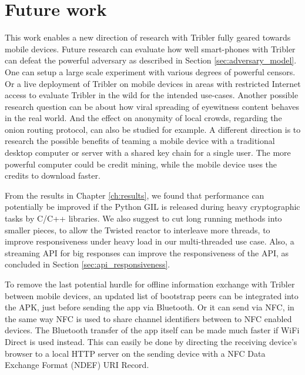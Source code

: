 \section{Future work}\label{sec:future_work}
This work enables a new direction of research with Tribler fully geared towards mobile devices.
Future research can evaluate how well smart-phones with Tribler can defeat the powerful adversary as described in Section \ref{sec:adversary_model}.
One can setup a large scale experiment with various degrees of powerful censors.
Or a live deployment of Tribler on mobile devices in areas with restricted Internet access to evaluate Tribler in the wild for the intended use-cases.
Another possible research question can be about how viral spreading of eyewitness content behaves in the real world.
And the effect on anonymity of local crowds, regarding the onion routing protocol, can also be studied for example.
A different direction is to research the possible benefits of teaming a mobile device with a traditional desktop computer or server with a shared key chain for a single user.
The more powerful computer could be credit mining, while the mobile device uses the credits to download faster.

From the results in Chapter \ref{ch:results}, we found that performance can potentially be improved if the Python GIL is released during heavy cryptographic tasks by C/C++ libraries.
We also suggest to cut long running methods into smaller pieces, to allow the Twisted reactor to interleave more threads, to improve responsiveness under heavy load in our multi-threaded use case.
Also, a streaming API for big responses can improve the responsiveness of the API, as concluded in Section \ref{sec:api_responsiveness}.

To remove the last potential hurdle for offline information exchange with Tribler between mobile devices, an updated list of bootstrap peers can be integrated into the APK, just before sending the app via Bluetooth.
Or it can send via NFC, in the same way NFC is used to share channel identifiers between to NFC enabled devices.
The Bluetooth transfer of the app itself can be made much faster if WiFi Direct is used instead.
This can easily be done by directing the receiving device's browser to a local HTTP server on the sending device with a NFC Data Exchange Format (NDEF) URI Record.

